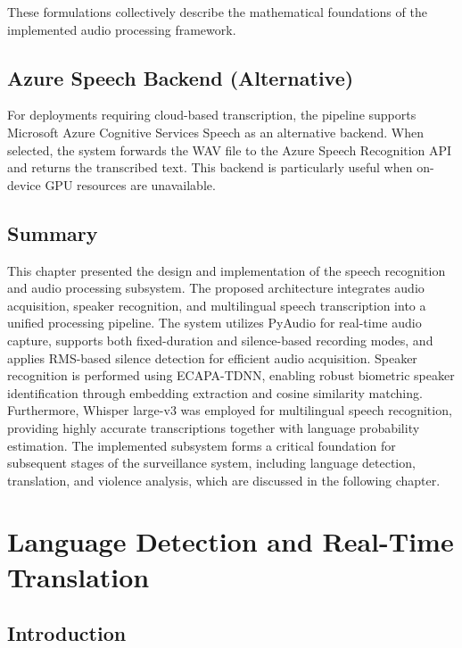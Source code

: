 \documentclass[12pt]{report}
\begin{document}
These formulations collectively describe the mathematical foundations of the implemented audio processing framework.

\section{Azure Speech Backend (Alternative)}
For deployments requiring cloud-based transcription, the pipeline supports Microsoft Azure Cognitive Services Speech as an alternative backend. When selected, the system forwards the WAV file to the Azure Speech Recognition API and returns the transcribed text. This backend is particularly useful when on-device GPU resources are unavailable.

\section{Summary}

This chapter presented the design and implementation of the speech recognition and audio processing subsystem. The proposed architecture integrates audio acquisition, speaker recognition, and multilingual speech transcription into a unified processing pipeline. The system utilizes PyAudio for real-time audio capture, supports both fixed-duration and silence-based recording modes, and applies RMS-based silence detection for efficient audio acquisition. Speaker recognition is performed using ECAPA-TDNN, enabling robust biometric speaker identification through embedding extraction and cosine similarity matching. Furthermore, Whisper large-v3 was employed for multilingual speech recognition, providing highly accurate transcriptions together with language probability estimation. The implemented subsystem forms a critical foundation for subsequent stages of the surveillance system, including language detection, translation, and violence analysis, which are discussed in the following chapter.

\newpage

\chapter{Language Detection and Real-Time Translation}
\setcounter{section}{0}

\section{Introduction}
\end{document}
